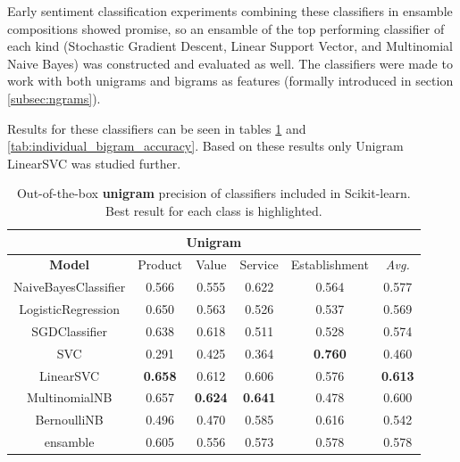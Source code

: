\documentclass[a4paper,11pt]{kth-mag}
\begin{document}
Early sentiment classification experiments combining these classifiers in ensamble compositions
showed promise, so an ensamble of the top performing
classifier of each kind (Stochastic Gradient Descent, Linear Support Vector, and Multinomial Naive Bayes)
was constructed and evaluated as well. The classifiers were made to work with both unigrams and bigrams
as features (formally introduced in section \ref{subsec:ngrams}).

Results for these classifiers can be seen in tables
\ref{tab:individual_unigram_accuracy} and \ref{tab:individual_bigram_accuracy}.
Based on these results only Unigram LinearSVC was studied further.


\begin{table}[h]
  \centering
  \begin{tabular}{| c | c | c | c | c || c |}
    \hline
    \multicolumn{6}{|c|}{Unigram} \\
    \hline
    \textbf{Model} & Product & Value & Service & Establishment & \emph{Avg.} \\ \hline
    NaiveBayesClassifier& 0.566 & 0.555 & 0.622 & 0.564 & 0.577 \\
    LogisticRegression  & 0.650 & 0.563 & 0.526 & 0.537 & 0.569 \\
    SGDClassifier       & 0.638 & 0.618 & 0.511 & 0.528 & 0.574 \\
    SVC                 & 0.291 & 0.425 & 0.364 & \textbf{0.760} & 0.460 \\
    LinearSVC           & \textbf{0.658} & 0.612 & 0.606 & 0.576 & \textbf{0.613} \\
    MultinomialNB       & 0.657 & \textbf{0.624} & \textbf{0.641} & 0.478 & 0.600 \\
    BernoulliNB         & 0.496 & 0.470 & 0.585 & 0.616 & 0.542 \\
    \hline
    ensamble            & 0.605 & 0.556 & 0.573 & 0.578 & 0.578 \\
    \hline
  \end{tabular}
  \caption{Out-of-the-box \textbf{unigram} precision of classifiers included in Scikit-learn.
    Best result for each class is highlighted.
  }
  \label{tab:individual_unigram_accuracy}


\end{table}
\end{document}
